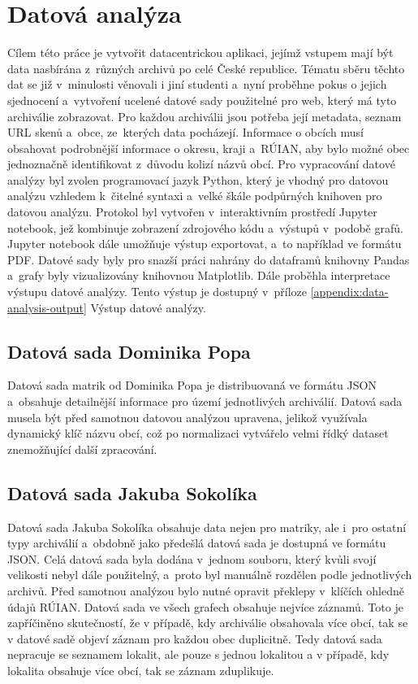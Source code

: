\chapter{Datová analýza}
Cílem této práce je vytvořit datacentrickou aplikaci, jejímž vstupem mají být data nasbírána z~různých archivů po celé České republice. Tématu sběru těchto dat se již v~minulosti věnovali i jiní studenti a~nyní proběhne pokus o jejich sjednocení a~vytvoření ucelené datové sady použitelné pro web, který má tyto archiválie zobrazovat. Pro každou archiválii jsou potřeba její metadata, seznam URL skenů a~obce, ze~kterých data pocházejí. Informace o obcích musí obsahovat podrobnější informace o okresu, kraji a~RÚIAN, aby bylo možné obec jednoznačně identifikovat z~důvodu kolizí názvů obcí. 
\newpara
Pro vypracování datové analýzy byl zvolen programovací jazyk Python, který je vhodný pro datovou analýzu vzhledem k~čitelné syntaxi a~velké škále podpůrných knihoven pro datovou analýzu. Protokol byl vytvořen v~interaktivním prostředí Jupyter notebook, jež kombinuje zobrazení zdrojového kódu a~výstupů v~podobě grafů. Jupyter notebook dále umožňuje výstup exportovat, a~to například ve formátu PDF. Datové sady byly pro snazší práci nahrány do dataframů knihovny Pandas a~grafy byly vizualizovány knihovnou Matplotlib. Dále proběhla interpretace výstupu datové analýzy. Tento výstup je dostupný v~příloze \ref{appendix:data-analysis-output} Výstup datové analýzy.

\section{Datová sada Dominika Popa }
Datová sada matrik od Dominika Popa \cite{Pop} je distribuovaná ve formátu JSON a~obsahuje detailnější informace pro území jednotlivých archiválií. Datová sada musela být před samotnou datovou analýzou upravena, jelikož využívala dynamický klíč názvu obcí, což po normalizaci vytvářelo velmi řídký dataset znemožňující další zpracování.

\section{Datová sada Jakuba Sokolíka}
Datová sada Jakuba Sokolíka \cite{Sokolik} obsahuje data nejen pro matriky, ale i~pro ostatní typy archiválií a~obdobně jako předešlá datová sada je dostupná ve formátu JSON. Celá datová sada byla dodána v~jednom souboru, který kvůli svojí velikosti nebyl dále použitelný, a~proto byl manuálně rozdělen podle jednotlivých archivů. Před samotnou analýzou bylo nutné opravit překlepy v~klíčích ohledně údajů RÚIAN. Datová sada ve všech grafech obsahuje nejvíce záznamů. Toto je zapříčiněno skutečností, že v případě, kdy archiválie obsahovala více obcí, tak se v datové sadě objeví záznam pro každou obec duplicitně. Tedy datová sada nepracuje se seznamem lokalit, ale pouze s jednou lokalitou a v případě, kdy lokalita obsahuje více obcí, tak se záznam zduplikuje.

